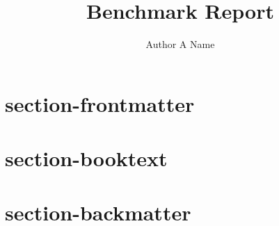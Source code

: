 \documentclass[11pt]{book}
\title{Benchmark Report}
\author{Author A Name}
\begin{document}
\maketitle
\def\title#1{\chapter{#1}}
\tableofcontents

\part{section-frontmatter}
        
        
        
        
        
        
        
        
\part{section-booktext}
        
        
        
        
        
        
\part{section-backmatter}
        
        


\printbibliography[title={Bibliography}]
\end{document}

